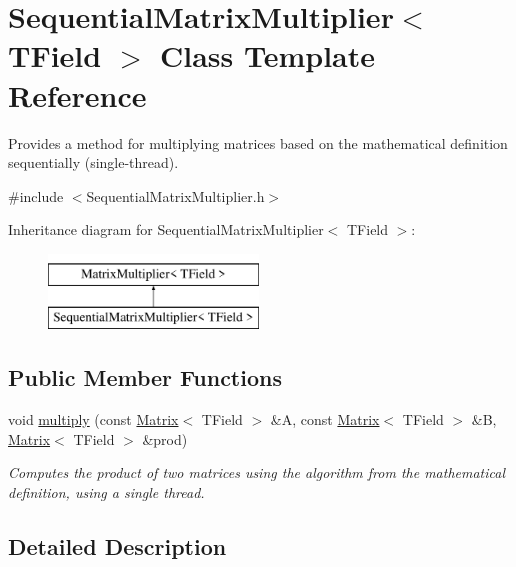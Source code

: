 \hypertarget{classSequentialMatrixMultiplier}{}\section{Sequential\+Matrix\+Multiplier$<$ T\+Field $>$ Class Template Reference}
\label{classSequentialMatrixMultiplier}


Provides a method for multiplying matrices based on the mathematical definition sequentially (single-\/thread).  




{\ttfamily \#include $<$Sequential\+Matrix\+Multiplier.\+h$>$}

Inheritance diagram for Sequential\+Matrix\+Multiplier$<$ T\+Field $>$\+:\begin{figure}[H]
\begin{center}
\leavevmode
\includegraphics[height=2.000000cm]{classSequentialMatrixMultiplier}
\end{center}
\end{figure}
\subsection*{Public Member Functions}
\begin{DoxyCompactItemize}
\item 
void \mbox{\hyperlink{classSequentialMatrixMultiplier_aeb79c1b8b364bfb810f20b6e2b192a1b}{multiply}} (const \mbox{\hyperlink{classMatrix}{Matrix}}$<$ T\+Field $>$ \&A, const \mbox{\hyperlink{classMatrix}{Matrix}}$<$ T\+Field $>$ \&B, \mbox{\hyperlink{classMatrix}{Matrix}}$<$ T\+Field $>$ \&prod)
\begin{DoxyCompactList}\small\item\em Computes the product of two matrices using the algorithm from the mathematical definition, using a single thread. \end{DoxyCompactList}\end{DoxyCompactItemize}


\subsection{Detailed Description}
